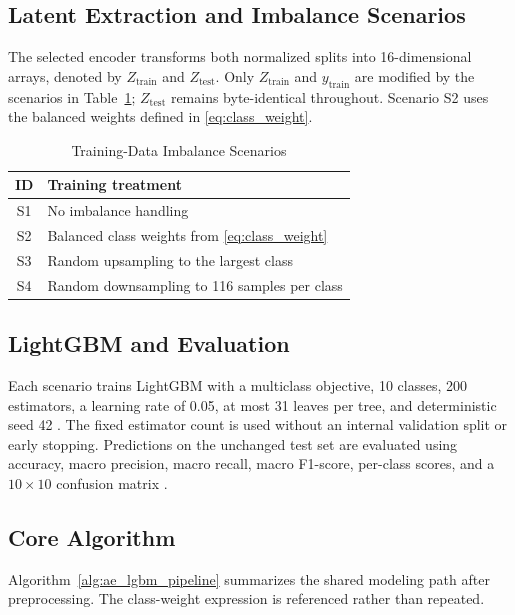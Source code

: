 \documentclass[conference]{IEEEtran}
\begin{document}
\subsection{Latent Extraction and Imbalance Scenarios}
The selected encoder transforms both normalized splits into 16-dimensional arrays, denoted by $Z_{\mathrm{train}}$ and $Z_{\mathrm{test}}$. Only $Z_{\mathrm{train}}$ and $y_{\mathrm{train}}$ are modified by the scenarios in Table~\ref{tab:imbalance_scenarios}; $Z_{\mathrm{test}}$ remains byte-identical throughout. Scenario S2 uses the balanced weights defined in \eqref{eq:class_weight}.

\begin{table}[t]
\caption{Training-Data Imbalance Scenarios}
\label{tab:imbalance_scenarios}
\centering
\footnotesize
\setlength{\tabcolsep}{4pt}
\renewcommand{\arraystretch}{0.95}
\begin{tabular}{@{}cl@{}}
\toprule
\textbf{ID} & \textbf{Training treatment} \\
\midrule
S1 & No imbalance handling \\
S2 & Balanced class weights from \eqref{eq:class_weight} \\
S3 & Random upsampling to the largest class \\
S4 & Random downsampling to 116 samples per class \\
\bottomrule
\end{tabular}
\end{table}

\subsection{LightGBM and Evaluation}
Each scenario trains LightGBM with a multiclass objective, 10 classes, 200 estimators, a learning rate of 0.05, at most 31 leaves per tree, and deterministic seed 42 \cite{Liu2021LightGBM,Munawar2025,Kouassi2025}. The fixed estimator count is used without an internal validation split or early stopping. Predictions on the unchanged test set are evaluated using accuracy, macro precision, macro recall, macro F1-score, per-class scores, and a $10\times10$ confusion matrix \cite{Ma2025FSLLM,Farhan2025,Wakili2025}.

\subsection{Core Algorithm}
Algorithm~\ref{alg:ae_lgbm_pipeline} summarizes the shared modeling path after preprocessing. The class-weight expression is referenced rather than repeated.
\end{document}
